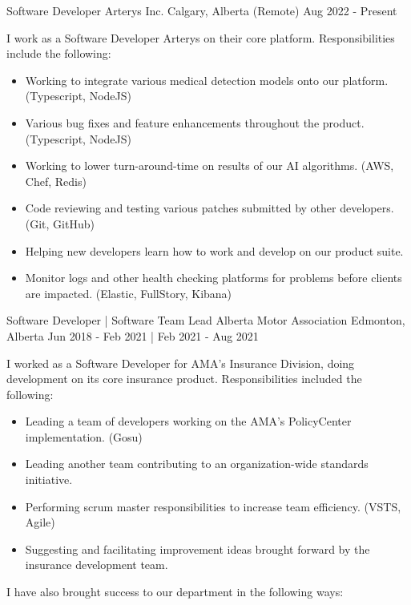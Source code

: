
\begin{cventries}
    \cventry
        {Software Developer}
        {Arterys Inc.}
        {Calgary, Alberta (Remote)}
        {Aug 2022 - Present}
        {
            I work as a Software Developer Arterys on their core platform.  Responsibilities include the following:
            \begin{itemize}
                \item Working to integrate various medical detection models onto our platform. (Typescript, NodeJS)
                \item Various bug fixes and feature enhancements throughout the product. (Typescript, NodeJS)
                \item Working to lower turn-around-time on results of our AI algorithms. (AWS, Chef, Redis)
                \item Code reviewing and testing various patches submitted by other developers. (Git, GitHub)
                \item Helping new developers learn how to work and develop on our product suite. 
                \item Monitor logs and other health checking platforms for problems before clients are impacted. (Elastic, FullStory, Kibana)
            \end{itemize}
        }
    \cventry
        {Software Developer | Software Team Lead}
        {Alberta Motor Association}
        {Edmonton, Alberta}
        {Jun 2018 - Feb 2021 | Feb 2021 - Aug 2021}
        {
            I worked as a Software Developer for AMA’s Insurance Division, doing development on its core insurance product.  Responsibilities included the following:
            \begin{itemize}
                \item Leading a team of developers working on the AMA's PolicyCenter implementation. (Gosu)
                \item Leading another team contributing to an organization-wide standards initiative. 
                \item Performing scrum master responsibilities to increase team efficiency. (VSTS, Agile)
                \item Suggesting and facilitating improvement ideas brought forward by the insurance development team.
            \end{itemize}
            I have also brought success to our department in the following ways:
}
\end{cventries}
